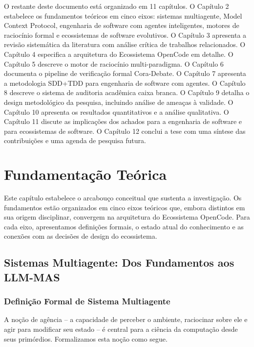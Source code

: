 \documentclass[12pt,a4paper,sumario=tradicional,openany]{abntex2}
\begin{document}
O restante deste documento está organizado em 11 capítulos. O Capítulo 2 estabelece os fundamentos teóricos em cinco eixos: sistemas multiagente, Model Context Protocol, engenharia de software com agentes inteligentes, motores de raciocínio formal e ecossistemas de software evolutivos. O Capítulo 3 apresenta a revisão sistemática da literatura com análise crítica de trabalhos relacionados. O Capítulo 4 especifica a arquitetura do Ecossistema OpenCode em detalhe. O Capítulo 5 descreve o motor de raciocínio multi-paradigma. O Capítulo 6 documenta o pipeline de verificação formal Cora-Debate. O Capítulo 7 apresenta a metodologia SDD+TDD para engenharia de software com agentes. O Capítulo 8 descreve o sistema de auditoria acadêmica caixa branca. O Capítulo 9 detalha o design metodológico da pesquisa, incluindo análise de ameaças à validade. O Capítulo 10 apresenta os resultados quantitativos e a análise qualitativa. O Capítulo 11 discute as implicações dos achados para a engenharia de software e para ecossistemas de software. O Capítulo 12 conclui a tese com uma síntese das contribuições e uma agenda de pesquisa futura.

\chapter{Fundamentação Teórica}

Este capítulo estabelece o arcabouço conceitual que sustenta a investigação. Os fundamentos estão organizados em cinco eixos teóricos que, embora distintos em sua origem disciplinar, convergem na arquitetura do Ecossistema OpenCode. Para cada eixo, apresentamos definições formais, o estado atual do conhecimento e as conexões com as decisões de design do ecossistema.

\section{Sistemas Multiagente: Dos Fundamentos aos LLM-MAS}

\subsection{Definição Formal de Sistema Multiagente}

A noção de agência -- a capacidade de perceber o ambiente, raciocinar sobre ele e agir para modificar seu estado -- é central para a ciência da computação desde seus primórdios. Formalizamos esta noção como segue.
\end{document}
